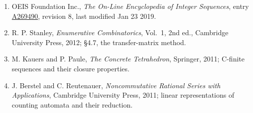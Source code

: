 \documentclass[11pt]{article}
\theoremstyle{definition}
\begin{document}
\begin{enumerate}

\item OEIS Foundation Inc., \emph{The On-Line Encyclopedia of Integer Sequences}, entry \href{https://oeis.org/A269490}{A269490}, revision 8, last modified Jan 23 2019.

\item R. P. Stanley, \emph{Enumerative Combinatorics}, Vol.~1, 2nd ed., Cambridge University Press, 2012; \S4.7, the transfer-matrix method.

\item M. Kauers and P. Paule, \emph{The Concrete Tetrahedron}, Springer, 2011; C-finite sequences and their closure properties.

\item J. Berstel and C. Reutenauer, \emph{Noncommutative Rational Series with Applications}, Cambridge University Press, 2011; linear representations of counting automata and their reduction.

\end{enumerate}
\end{document}
